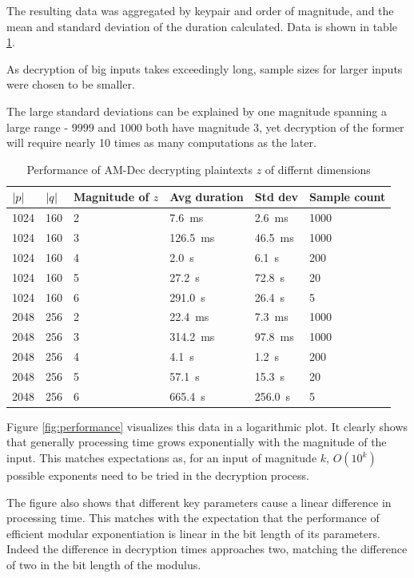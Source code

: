 \documentclass[a4paper]{scrreprt}
\DeclarePairedDelimiter\abs{\lvert}{\rvert}
\begin{document}
The resulting data was aggregated by keypair and order of magnitude, and the
mean and standard deviation of the duration calculated. Data is shown in table
\ref{tbl:performance}.

As decryption of big inputs takes exceedingly long, sample sizes for larger
inputs were chosen to be smaller.

The large standard deviations can be explained by one magnitude spanning a large
range - $9999$ and $1000$ both have magnitude $3$, yet decryption of the former
will require nearly 10 times as many computations as the later.

\begin{table}
		\begin{tabular}{llllll}
				\toprule
				$\abs{p}$ & $\abs{q}$ & Magnitude of $z$ & Avg duration & Std dev & Sample count \\
				\midrule
				1024 & 160 & 2 & \SI{7.6}{\ms}   & \SI{2.6}{\ms}   & 1000 \\
				1024 & 160 & 3 & \SI{126.5}{\ms} & \SI{46.5}{\ms}  & 1000 \\
				1024 & 160 & 4 & \SI{2.0}{\s}    & \SI{6.1}{\s}    & 200 \\
				1024 & 160 & 5 & \SI{27.2}{\s}   & \SI{72.8}{\s}   & 20 \\
				1024 & 160 & 6 & \SI{291.0}{\s}  & \SI{26.4}{\s}   & 5 \\
				2048 & 256 & 2 & \SI{22.4}{\ms}  & \SI{7.3}{\ms}   & 1000 \\
				2048 & 256 & 3 & \SI{314.2}{\ms} & \SI{97.8}{\ms}  & 1000 \\
				2048 & 256 & 4 & \SI{4.1}{\s}    & \SI{1.2}{\s}    & 200 \\
				2048 & 256 & 5 & \SI{57.1}{\s}   & \SI{15.3}{\s}   & 20 \\
				2048 & 256 & 6 & \SI{665.4}{\s}  & \SI{256.0}{\s}  & 5 \\
				\bottomrule
		\end{tabular}
		\caption{Performance of AM-Dec decrypting plaintexts $z$ of differnt dimensions}
		\label{tbl:performance}
\end{table}

Figure \ref{fig:performance} visualizes this data in a logarithmic plot. It
clearly shows that generally processing time grows exponentially with the
magnitude of the input. This matches expectations as, for an input of magnitude
$k$, $O(10^k)$ possible exponents need to be tried in the decryption process.

The figure also shows that different key parameters cause a linear difference
in processing time. This matches with the expectation that the performance of
efficient modular exponentiation is linear in the bit length of its parameters.
Indeed the difference in decryption times approaches two, matching the
difference of two in the bit length of the modulus.
\end{document}
